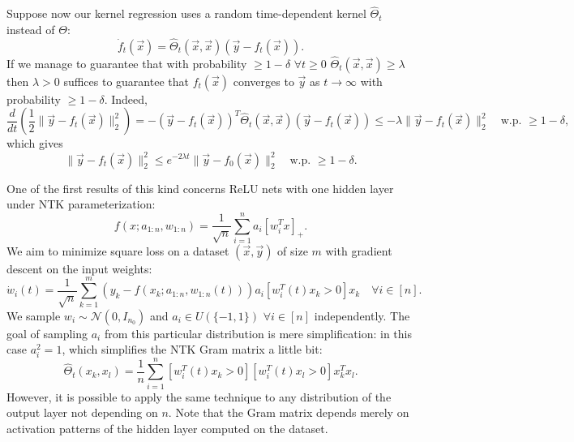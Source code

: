 \documentclass{article}
\newcommand{\NN}{\mathcal{N}}
\begin{document}
    Suppose now our kernel regression uses a random time-dependent kernel $\hat\Theta_t$ instead of $\Theta$:
    \begin{equation}
        \dot f_t(\vec x)
        = \hat\Theta_t(\vec x, \vec x) (\vec y - f_t(\vec x)).
    \end{equation}
    If we manage to guarantee that with probability $\geq 1-\delta$ $\forall t \geq 0$ $\hat\Theta_t(\vec x, \vec x) \geq \lambda$ then $\lambda > 0$ suffices to guarantee that $f_t(\vec x)$ converges to $\vec y$ as $t \to \infty$ with probability $\geq 1-\delta$.
    Indeed,
    \begin{equation}
        \frac{d}{dt}\left(\frac{1}{2} \| \vec y - f_t(\vec x) \|_2^2\right)
        = -(\vec y - f_t(\vec x))^T \hat\Theta_t(\vec x, \vec x) (\vec y - f_t(\vec x))
        \leq -\lambda \| \vec y - f_t(\vec x) \|_2^2
        \quad
        \text{w.p. $\geq 1-\delta$},
    \end{equation}
    which gives
    \begin{equation}
        \| \vec y - f_t(\vec x) \|_2^2
        \leq e^{-2 \lambda t} \| \vec y - f_0(\vec x) \|_2^2
        \quad
        \text{w.p. $\geq 1-\delta$}.
    \end{equation}

    One of the first results of this kind concerns ReLU nets with one hidden layer under NTK parameterization:
    \begin{equation}
        f(x; a_{1:n}, w_{1:n})
        = \frac{1}{\sqrt{n}} \sum_{i=1}^n a_i [w_i^T x]_+.
        \label{eq:two_layered_ReLU_net_ntk}
    \end{equation}
    We aim to minimize square loss on a dataset $(\vec x, \vec y)$ of size $m$ with gradient descent on the input weights:
    \begin{equation}
        \dot w_i(t)
        = \frac{1}{\sqrt{n}} \sum_{k=1}^m (y_k - f(x_k; a_{1:n}, w_{1:n}(t))) a_i [w_i^T(t) x_k > 0] x_k
        \quad
        \forall i \in [n].
    \end{equation}
    We sample $w_i \sim \NN(0,I_{n_0})$ and $a_i \in U(\{-1,1\})$ $\forall i \in [n]$ independently.
    The goal of sampling $a_i$ from this particular distribution is mere simplification: in this case $a_i^2 = 1$, which simplifies the NTK Gram matrix a little bit:
    \begin{equation}
        \hat\Theta_t(x_k, x_l) =
        \frac{1}{n} \sum_{i=1}^n [w_i^T(t) x_k > 0] [w_i^T(t) x_l > 0] x_k^T x_l.
    \end{equation}
    However, it is possible to apply the same technique to any distribution of the output layer not depending on $n$.
    Note that the Gram matrix depends merely on activation patterns of the hidden layer computed on the dataset.
\end{document}
